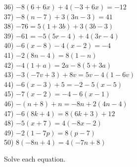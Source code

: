 \documentclass[12pt]{article}
\theoremstyle{definition}
\begin{document}
\begin{multicols}{2}
  36) $- 8 (6 + 6 x) + 4 (- 3 + 6 x) = - 12$\\
  37) $- 8 (n - 7) + 3 (3 n - 3) = 41$\\
  38) $- 76 = 5 (1 + 3 b) + 3 (3 b - 3)$\\
  39) $- 61 = - 5 (5 r - 4) + 4 (3 r - 4)$\\
  40) $- 6 (x - 8) - 4 (x - 2) = - 4$\\
  41) $- 2 (8 n - 4) = 8 (1 - n)$\\
  42) $- 4 (1 + a) = 2 a - 8 (5 + 3 a) $\\
  43) $- 3 (- 7 v + 3) + 8 v = 5 v - 4 (1 - 6 v) $\\
  44) $- 6 (x - 3) + 5 = - 2 - 5 (x - 5)$\\
  45) $- 7 (x - 2) = - 4 - 6 (x - 1)$\\
  46) $- (n + 8) + n = - 8 n + 2 (4 n - 4)$\\
  47) $- 6 (8 k + 4) =  8 (6 k + 3) + 12$\\
  48) $- 5 (x + 7) = 4 (- 8 x - 2)$\\
  49) $- 2 (1 - 7 p) = 8 (p - 7)$\\
  50) $8 (- 8 n + 4) = 4 (- 7 n + 8)$
\end{multicols}

Solve each equation.
\end{document}
